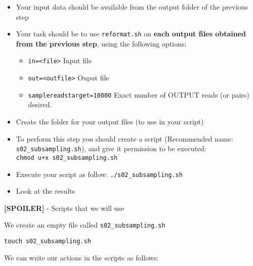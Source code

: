 \documentclass[
]{book}
\newenvironment{Shaded}{\begin{snugshade}}{\end{snugshade}}
\newcommand{\AttributeTok}[1]{\textcolor[rgb]{0.13,0.29,0.53}{#1}}
\newcommand{\BuiltInTok}[1]{#1}
\newcommand{\CommentTok}[1]{\textcolor[rgb]{0.56,0.35,0.01}{\textit{#1}}}
\newcommand{\ControlFlowTok}[1]{\textcolor[rgb]{0.13,0.29,0.53}{\textbf{#1}}}
\newcommand{\ExtensionTok}[1]{#1}
\newcommand{\FunctionTok}[1]{\textcolor[rgb]{0.13,0.29,0.53}{\textbf{#1}}}
\newcommand{\KeywordTok}[1]{\textcolor[rgb]{0.13,0.29,0.53}{\textbf{#1}}}
\newcommand{\NormalTok}[1]{#1}
\newcommand{\OperatorTok}[1]{\textcolor[rgb]{0.81,0.36,0.00}{\textbf{#1}}}
\newcommand{\PreprocessorTok}[1]{\textcolor[rgb]{0.56,0.35,0.01}{\textit{#1}}}
\newcommand{\StringTok}[1]{\textcolor[rgb]{0.31,0.60,0.02}{#1}}
\newcommand{\VariableTok}[1]{\textcolor[rgb]{0.00,0.00,0.00}{#1}}
\providecommand{\tightlist}{%
  \setlength{\itemsep}{0pt}\setlength{\parskip}{0pt}}
\begin{document}
\begin{itemize}
\tightlist
\item
  Your input data should be available from the output folder of the previous step
\item
  Your task should be to use \texttt{reformat.sh} on \textbf{each output files obtained from the previous step}, using the following options:

  \begin{itemize}
  \tightlist
  \item
    \texttt{in=\textless{}file\textgreater{}} Input file
  \item
    \texttt{out=\textless{}outfile\textgreater{}} Ouput file
  \item
    \texttt{samplereadstarget=10000} Exact number of OUTPUT reads (or pairs) desired.
  \end{itemize}
\item
  Create the folder for your output files (to use in your script)
\item
  To perform this step you should create a script (Recommended name: \texttt{s02\_subsampling.sh}), and give it permission to be executed: \texttt{chmod\ u+x\ s02\_subsampling.sh}
\item
  Execute your script as follow: \texttt{./s02\_subsampling.sh}
\item
  Look at the results
\end{itemize}

\textbf{{[}SPOILER{]}} - Scripts that we will use

We create an empty file called \texttt{s02\_subsampling.sh}

\texttt{touch\ s02\_subsampling.sh}

We can write our actions in the scripts as follows:

\begin{Shaded}
\end{Shaded}
\end{document}
